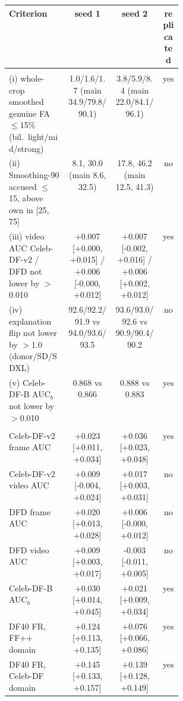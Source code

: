 \begin{tabular}{@{}>{\raggedright\arraybackslash}p{0.34\linewidth} c c c@{}}
\toprule
Criterion & seed 1 & seed 2 & replicated \\
\midrule
\multicolumn{4}{@{}l}{(A) symmetric-view variant against \ours{}, same seed} \\
(i) whole-crop smoothed genuine FA $\le$15\% (bil.\ light/mid/strong) & 1.0/1.6/1.7 (main 34.9/79.8/90.1) & 3.8/5.9/8.4 (main 22.0/84.1/96.1) & yes \\
(ii) Smoothing-90 accused $\le$15, above own in [25, 75] & 8.1, 30.0 (main 8.6, 32.5) & 17.8, 46.2 (main 12.5, 41.3) & no \\
(iii) video AUC Celeb-DF-v2 / DFD not lower by $>$0.010 & +0.007 [+0.000, +0.015] / +0.006 [-0.000, +0.012] & +0.007 [-0.002, +0.016] / +0.006 [+0.002, +0.012] & yes \\
(iv) explanation flip not lower by $>$1.0 (donor/SD/SDXL) & 92.6/92.2/91.9 vs 94.0/93.6/93.5 & 93.6/93.0/92.6 vs 90.9/90.4/90.2 & no \\
(v) Celeb-DF-B AUC$_b$ not lower by $>$0.010 & 0.868 vs 0.866 & 0.888 vs 0.883 & yes \\
\midrule
\multicolumn{4}{@{}l}{(B) binary control minus \ours{}, same seed} \\
Celeb-DF-v2 frame AUC & +0.023 [+0.011, +0.034] & +0.036 [+0.023, +0.048] & yes \\
Celeb-DF-v2 video AUC & +0.009 [-0.004, +0.024] & +0.017 [+0.003, +0.031] & no \\
DFD frame AUC & +0.020 [+0.013, +0.028] & +0.006 [-0.000, +0.012] & no \\
DFD video AUC & +0.009 [+0.003, +0.017] & -0.003 [-0.011, +0.005] & no \\
Celeb-DF-B AUC$_b$ & +0.030 [+0.014, +0.045] & +0.021 [+0.009, +0.034] & yes \\
DF40 FR, FF++ domain & +0.124 [+0.113, +0.135] & +0.076 [+0.066, +0.086] & yes \\
DF40 FR, Celeb-DF domain & +0.145 [+0.133, +0.157] & +0.139 [+0.128, +0.149] & yes \\
\bottomrule
\end{tabular}

